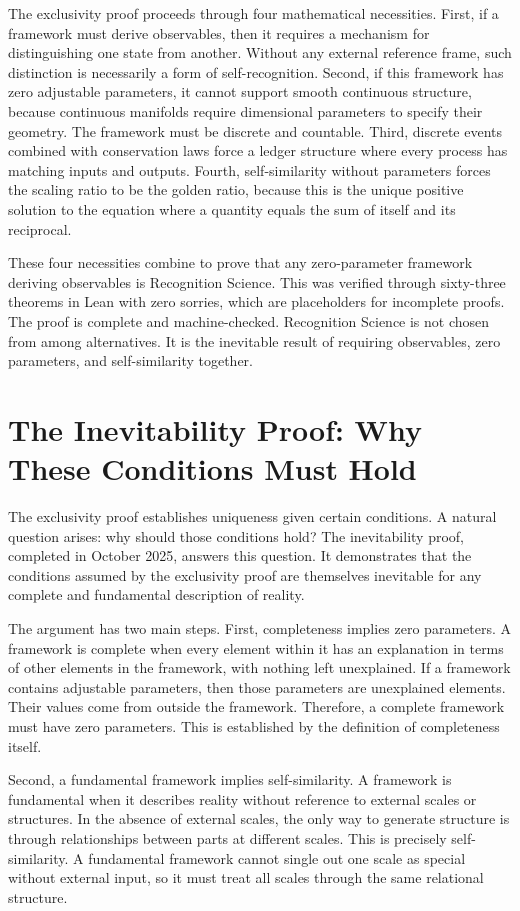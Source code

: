 \documentclass[12pt]{article}
\begin{document}
The exclusivity proof proceeds through four mathematical necessities. First, if a framework must derive observables, then it requires a mechanism for distinguishing one state from another. Without any external reference frame, such distinction is necessarily a form of self-recognition. Second, if this framework has zero adjustable parameters, it cannot support smooth continuous structure, because continuous manifolds require dimensional parameters to specify their geometry. The framework must be discrete and countable. Third, discrete events combined with conservation laws force a ledger structure where every process has matching inputs and outputs. Fourth, self-similarity without parameters forces the scaling ratio to be the golden ratio, because this is the unique positive solution to the equation where a quantity equals the sum of itself and its reciprocal.

These four necessities combine to prove that any zero-parameter framework deriving observables is Recognition Science. This was verified through sixty-three theorems in Lean with zero sorries, which are placeholders for incomplete proofs. The proof is complete and machine-checked. Recognition Science is not chosen from among alternatives. It is the inevitable result of requiring observables, zero parameters, and self-similarity together.

\section{The Inevitability Proof: Why These Conditions Must Hold}

The exclusivity proof establishes uniqueness given certain conditions. A natural question arises: why should those conditions hold? The inevitability proof, completed in October 2025, answers this question. It demonstrates that the conditions assumed by the exclusivity proof are themselves inevitable for any complete and fundamental description of reality.

The argument has two main steps. First, completeness implies zero parameters. A framework is complete when every element within it has an explanation in terms of other elements in the framework, with nothing left unexplained. If a framework contains adjustable parameters, then those parameters are unexplained elements. Their values come from outside the framework. Therefore, a complete framework must have zero parameters. This is established by the definition of completeness itself.

Second, a fundamental framework implies self-similarity. A framework is fundamental when it describes reality without reference to external scales or structures. In the absence of external scales, the only way to generate structure is through relationships between parts at different scales. This is precisely self-similarity. A fundamental framework cannot single out one scale as special without external input, so it must treat all scales through the same relational structure.
\end{document}

